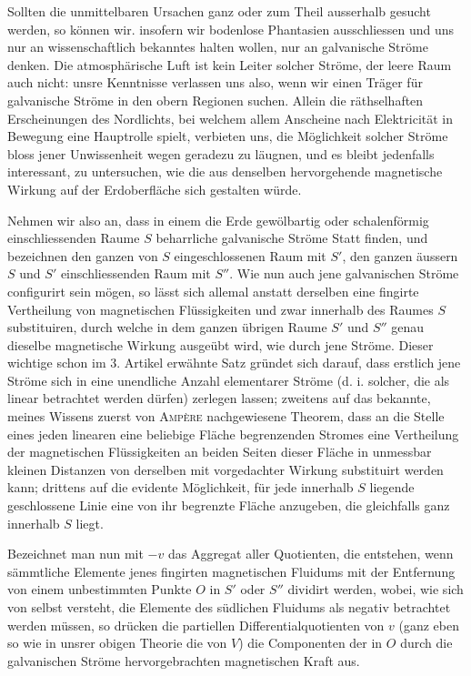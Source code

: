Sollten die unmittelbaren Ursachen ganz oder zum Theil ausserhalb gesucht werden, so können wir. insofern wir bodenlose Phantasien ausschliessen und uns nur an wissenschaftlich bekanntes halten wollen, nur an galvanische Ströme denken. Die atmosphärische Luft ist kein Leiter solcher Ströme, der leere Raum auch nicht: unsre Kenntnisse verlassen uns also, wenn wir einen Träger für galvanische Ströme in den obern Regionen suchen. Allein die räthselhaften Erscheinungen des Nordlichts, bei welchem allem Anscheine nach Elektricität in Bewegung eine Hauptrolle spielt, verbieten uns, die Möglichkeit solcher Ströme bloss jener Unwissenheit wegen geradezu zu läugnen, und es bleibt jedenfalls interessant, zu untersuchen, wie die aus denselben hervorgehende magnetische Wirkung auf der Erdoberfläche sich gestalten würde.

Nehmen wir also an, dass in einem die Erde gewölbartig oder schalenförmig einschliessenden Raume $S$ beharrliche galvanische Ströme Statt finden, und bezeichnen den ganzen von $S$ eingeschlossenen Raum mit $S'$, den ganzen äussern $S$ und $S'$ einschliessenden Raum mit $S''$. Wie nun auch jene galvanischen Ströme configurirt sein mögen, so lässt sich allemal anstatt derselben eine fingirte Vertheilung von magnetischen Flüssigkeiten und zwar innerhalb des Raumes $S$ substituiren, durch welche in dem ganzen übrigen Raume $S'$ und $S''$ genau dieselbe magnetische Wirkung ausgeübt wird, wie durch jene Ströme. Dieser wichtige schon im 3. Artikel erwähnte Satz gründet sich darauf, dass erstlich jene Ströme sich in eine unendliche Anzahl elementarer Ströme (d. i. solcher, die als linear betrachtet werden dürfen) zerlegen lassen; zweitens auf das bekannte, meines Wissens zuerst von \textsc{Ampère} nachgewiesene Theorem, dass an die Stelle eines jeden linearen eine beliebige Fläche begrenzenden Stromes eine Vertheilung der magnetischen Flüssigkeiten an beiden Seiten dieser Fläche in unmessbar kleinen Distanzen von derselben mit vorgedachter Wirkung substituirt werden kann; drittens auf die evidente Möglichkeit, für jede innerhalb $S$ liegende geschlossene Linie eine von ihr begrenzte Fläche anzugeben, die gleichfalls ganz innerhalb $S$ liegt.

\par{}
\par\clearpage
{}
Bezeichnet man nun mit $-v$ das Aggregat aller Quotienten, die entstehen, wenn sämmtliche Elemente jenes fingirten magnetischen Fluidums mit der Entfernung von einem unbestimmten Punkte $O$ in $S'$ oder $S''$ dividirt werden, wobei, wie sich von selbst versteht, die Elemente des südlichen Fluidums als negativ betrachtet werden müssen, so drücken die partiellen Differentialquotienten von $v$ (ganz eben so wie in unsrer obigen Theorie die von $V$) die Componenten der in $O$ durch die galvanischen Ströme hervorgebrachten magnetischen Kraft aus.

